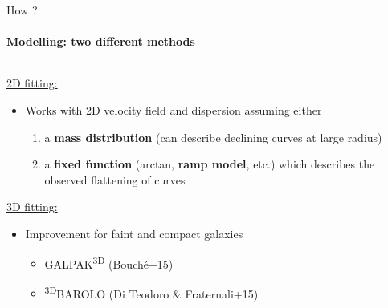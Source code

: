 \documentclass[usenames,dvipsnames]{beamer}
\begin{document}
\begin{frame}{How ?}
	\framesubtitle{Modelling: two different methods}
	\begin{columns}[T]
		\begin{column}{\linewidth}
			
			\underline{2D fitting:}
			\begin{itemize}[label=$\rhd$]
				\item Works with 2D velocity field and dispersion assuming either
				
			\begin{enumerate}[label=(\alph*)]
				\item a \textbf{mass distribution} (can describe declining curves at large radius)
				\item a \textbf{fixed function} (arctan, \textbf{ramp model}, etc.) which describes the  observed flattening of curves
			\end{enumerate}
				
			\end{itemize}
			
			\vfill
			
			\underline{3D fitting:}
			\begin{itemize}[label=$\rhd$]
				\item Improvement for faint and compact galaxies
				
				\begin{itemize}[label=$\circ$]
					\item GALPAK\textsuperscript{3D} (Bouché+15)
					\item \textsuperscript{3D}BAROLO (Di Teodoro \& Fraternali+15)
				\end{itemize}
			\end{itemize}		
		\end{column}
	\end{columns}
\end{frame}
\end{document}
